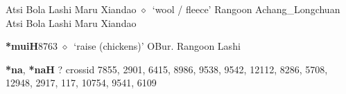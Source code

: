 \begin{list}{}{\leftmargin=1.5em \itemindent=-1.5em}
         Atsi 
\hspace{1ex}
         Bola 
\hspace{1ex}
         Lashi 
\hspace{1ex}
         Maru 
\hspace{1ex}
         Xiandao 
\hspace{1ex}
         $\diamond$~`wool / fleece'
         Rangoon 
\hspace{1ex}
         Achang\_Longchuan 
\hspace{1ex}
         Atsi 
\hspace{1ex}
         Bola 
\hspace{1ex}
         Lashi 
\hspace{1ex}
         Maru 
\hspace{1ex}
         Xiandao 
  \item {\footnotesize \textbf{*muiH}}{\tiny 8763}
\hspace{1ex}
         $\diamond$~`raise (chickens)'
         OBur. 
\hspace{1ex}
         Rangoon 
\hspace{1ex}
         Lashi 
  \end{list}
\item
\textbf{*na}, \textbf{*naH}
?
  {\tiny crossid 7855, 2901, 6415, 8986, 9538, 9542, 12112, 8286, 5708, 12948, 2917, 117, 10754, 9541, 6109}

